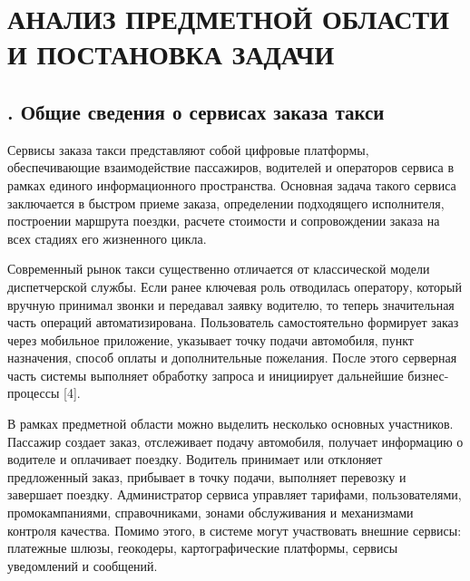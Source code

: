 \setcounter{chaptercntr}{1}

\sectionbreak \section*{
	\gostTitleFont
	\redline
	\thechaptercntr \space
	АНАЛИЗ ПРЕДМЕТНОЙ ОБЛАСТИ И ПОСТАНОВКА ЗАДАЧИ
}

\titlespace

\subsection*{
	\gostTitleFont
	\redline
	\thechaptercntr .\thesubchaptercntr \spc
	Общие сведения о сервисах заказа такси
} \addtocounter{subchaptercntr}{1}

\subtitlespace

{\gostFont
	
	\par \redline Сервисы заказа такси представляют собой цифровые платформы, обеспечивающие взаимодействие пассажиров, водителей и операторов сервиса в рамках единого информационного пространства. Основная задача такого сервиса заключается в быстром приеме заказа, определении подходящего исполнителя, построении маршрута поездки, расчете стоимости и сопровождении заказа на всех стадиях его жизненного цикла.
	
	\par \redline Современный рынок такси существенно отличается от классической модели диспетчерской службы. Если ранее ключевая роль отводилась оператору, который вручную принимал звонки и передавал заявку водителю, то теперь значительная часть операций автоматизирована. Пользователь самостоятельно формирует заказ через мобильное приложение, указывает точку подачи автомобиля, пункт назначения, способ оплаты и дополнительные пожелания. После этого серверная часть системы выполняет обработку запроса и инициирует дальнейшие бизнес-процессы [4].
	
	\par \redline В рамках предметной области можно выделить несколько основных участников. Пассажир создает заказ, отслеживает подачу автомобиля, получает информацию о водителе и оплачивает поездку. Водитель принимает или отклоняет предложенный заказ, прибывает в точку подачи, выполняет перевозку и завершает поездку. Администратор сервиса управляет тарифами, пользователями, промокампаниями, справочниками, зонами обслуживания и механизмами контроля качества. Помимо этого, в системе могут участвовать внешние сервисы: платежные шлюзы, геокодеры, картографические платформы, сервисы уведомлений и сообщений.
	
}
